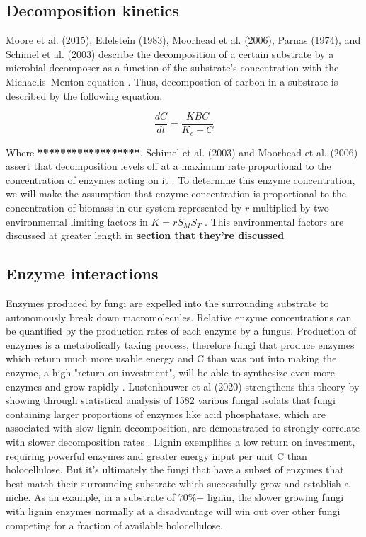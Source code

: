 \documentclass[12pt]{article}
\begin{document}
\begin{multicols}{2}
\subsection{Decomposition kinetics}
Moore et al. (2015), Edelstein (1983), Moorhead et al. (2006), Parnas (1974), and Schimel et al. (2003) describe the decomposition of a certain substrate by a microbial decomposer as a function of the substrate's concentration with the Michaelis–Menton equation \cite{Moore2015, Edelstein1983, Moorhead2006, Parnas1975, Schimel2003}. Thus, decompostion of carbon in a substrate is described by the following equation.

\begin{equation} \label{eq:3}
\frac{dC}{dt} = \frac{KBC}{K_{e}+C}
\end{equation}

Where \textbf{******************}. Schimel et al. (2003) and Moorhead et al. (2006) assert that decomposition levels off at a maximum rate proportional to the concentration of enzymes acting on it \cite{Schimel2003, Moorhead2006}. To determine this enzyme concentration, we will make the assumption that enzyme concentration is proportional to the concentration of biomass in our system represented by $r$ multiplied by two environmental limiting factors in $K=rS_{M}S_{T}$ \cite{Schimel2003}. This environmental factors are discussed at greater length in \textbf{section that they're discussed}

\subsection{Enzyme interactions}

Enzymes produced by fungi are expelled into the surrounding substrate to autonomously break down macromolecules. Relative enzyme concentrations can be quantified by the production rates of each enzyme by a fungus. Production of enzymes is a metabolically taxing process, therefore fungi that produce enzymes which return much more usable energy and C than was put into making the enzyme, a high "return on investment", will be able to synthesize even more enzymes and grow rapidly \cite{Schimel2003}. Lustenhouwer et al (2020) strengthens this theory by showing through statistical analysis of 1582 various fungal isolats that fungi containing larger proportions of enzymes like acid phosphatase, which are associated with slow lignin decomposition, are demonstrated to strongly correlate with slower decomposition rates \cite{Lustenhouwer2020}. Lignin exemplifies a low return on investment, requiring powerful enzymes and greater energy input per unit C than holocellulose. But it's ultimately the fungi that have a subset of enzymes that best match their surrounding substrate which successfully grow and establish a niche. As an example, in a substrate of 70\%+ lignin, the slower growing fungi with lignin enzymes normally at a disadvantage will win out over other fungi competing for a fraction of available holocellulose.


\end{multicols}
\end{document}
